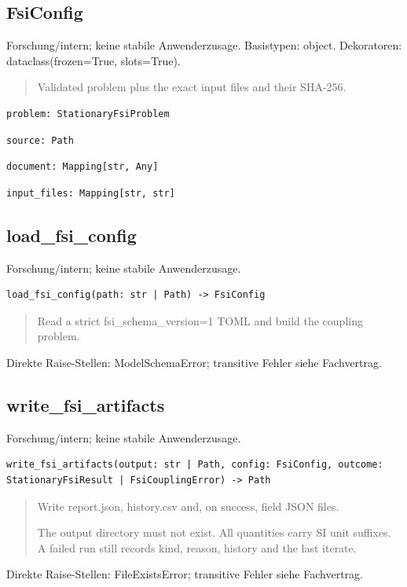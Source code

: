 \subsection{FsiConfig}
Forschung/intern; keine stabile Anwenderzusage.
Basistypen: object. Dekoratoren: dataclass(frozen=True, slots=True).
\begin{quote}
Validated problem plus the exact input files and their SHA-256.
\end{quote}
\begin{lstlisting}
problem: StationaryFsiProblem
\end{lstlisting}
\begin{lstlisting}
source: Path
\end{lstlisting}
\begin{lstlisting}
document: Mapping[str, Any]
\end{lstlisting}
\begin{lstlisting}
input_files: Mapping[str, str]
\end{lstlisting}
\subsection{load\_fsi\_config}
Forschung/intern; keine stabile Anwenderzusage.
\begin{lstlisting}
load_fsi_config(path: str | Path) -> FsiConfig
\end{lstlisting}
\begin{quote}
Read a strict fsi\_schema\_version=1 TOML and build the coupling problem.
\end{quote}
Direkte Raise-Stellen: ModelSchemaError; transitive Fehler siehe Fachvertrag.
\subsection{write\_fsi\_artifacts}
Forschung/intern; keine stabile Anwenderzusage.
\begin{lstlisting}
write_fsi_artifacts(output: str | Path, config: FsiConfig, outcome: StationaryFsiResult | FsiCouplingError) -> Path
\end{lstlisting}
\begin{quote}
Write report.json, history.csv and, on success, field JSON files.\par The output directory must not exist. All quantities carry SI unit suffixes. A failed run still records kind, reason, history and the last iterate.
\end{quote}
Direkte Raise-Stellen: FileExistsError; transitive Fehler siehe Fachvertrag.
